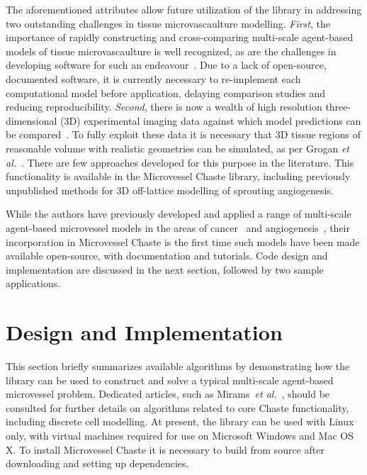 \documentclass[10pt,letterpaper]{article}
\begin{document}
The aforementioned attributes allow future utilization of the library in addressing two outstanding challenges in tissue microvascaulture modelling. \emph{First}, the importance of rapidly constructing and cross-comparing multi-scale agent-based models of tissue microvascaulture is well recognized, as are the challenges in developing software for such an endeavour~\cite{Rieger2015, Connor2012}. Due to a lack of open-source, documented software, it is currently necessary to re-implement each computational model before application, delaying comparison studies and reducing reproducibility. \emph{Second}, there is now a wealth of high resolution three-dimensional (3D) experimental imaging data against which model predictions can be compared~\cite{Tozer2004}. To fully exploit these data it is necessary that 3D tissue regions of reasonable volume with realistic geometries can be simulated, as per Grogan \emph{et al.}~\cite{Grogan2016}. There are few approaches developed for this purpose in the literature. This functionality is available in the Microvessel Chaste library, including previously unpublished methods for 3D off-lattice modelling of sprouting angiogenesis.  

While the authors have previously developed and applied a range of multi-scale agent-based microvessel models in the areas of cancer~\cite{Alarcon2006, Perfahl2011, Grogan2016} and angiogenesis~\cite{Connor2015}, their incorporation in Microvessel Chaste is the first time such models have been made available open-source, with documentation and tutorials. Code design and implementation are discussed in the next section, followed by two sample applications. 	

\section*{Design and Implementation}

This section briefly summarizes available algorithms by demonstrating how the library can be used to construct and solve a typical multi-scale agent-based microvessel problem. Dedicated articles, such as Mirams~\emph{et al.}~\cite{Mirams2013}, should be consulted for further details on algorithms related to core Chaste functionality, including discrete cell modelling. At present, the library can be used with Linux only, with virtual machines required for use on Microsoft Windows and Mac OS X. To install Microvessel Chaste it is necessary to build from source after downloading and setting up dependencies. 
\end{document}
